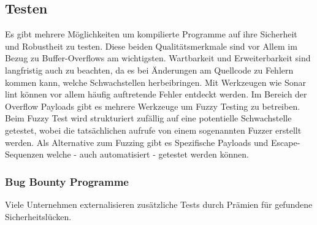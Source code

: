 \subsection{Testen}
Es gibt mehrere Möglichkeiten um kompilierte Programme auf ihre Sicherheit
und Robustheit zu testen. Diese beiden Qualitätsmerkmale sind vor Allem
im Bezug zu Buffer-Overflows am wichtigsten. Wartbarkeit und Erweiterbarkeit
sind langfristig auch zu beachten, da es bei Änderungen am Quellcode
zu Fehlern kommen kann, welche Schwachstellen herbeibringen.
Mit Werkzeugen wie Sonar lint können vor allem häufig auftretende Fehler entdeckt
werden.
Im Bereich der Overflow Payloads gibt es mehrere Werkzeuge um Fuzzy Testing
zu betreiben. Beim Fuzzy Test wird strukturiert zufällig auf eine
potentielle Schwachstelle getestet, wobei die tatsächlichen aufrufe
von einem sogenannten Fuzzer erstellt werden.
Als Alternative zum Fuzzing gibt es Spezifische Payloads und
Escape-Sequenzen welche - auch automatisiert - getestet werden können.

\subsubsection{Bug Bounty Programme}
Viele Unternehmen externalisieren zusätzliche Tests durch Prämien für gefundene Sicherheitslücken.

